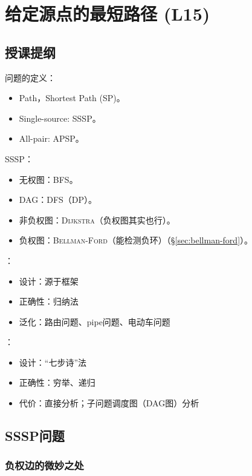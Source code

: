 \chapter{给定源点的最短路径 (L15)}

\section*{授课提纲}

\nid 问题的定义：
\begin{itemize}
    \item Path，Shortest Path (SP)。
    \item Single-source: SSSP。
    \item All-pair: APSP。
\end{itemize}

\nid SSSP：
\begin{itemize}
    \item 无权图：BFS。
    \item DAG：DFS（DP）。
    \item 非负权图：\textsc{Dijkstra}（负权图其实也行）。
    \item 负权图：\textsc{Bellman-Ford}（能检测负环）（\S \ref{sec:bellman-ford}）。
\end{itemize}

\nid {}：
\begin{itemize}
    \item 设计：源于框架
    \item 正确性：归纳法
    \item 泛化：路由问题、pipe问题、电动车问题
\end{itemize}


\nid {}：
\begin{itemize}
    \item 设计：“七步诗”法
    \item 正确性：穷举、递归
    \item 代价：直接分析；子问题调度图（DAG图）分析
\end{itemize}


\section{SSSP问题}

\subsection{负权边的微妙之处}

